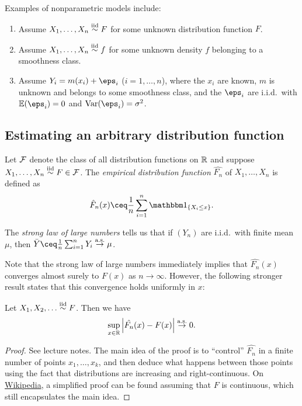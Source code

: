 \begin{example}
    Examples of nonparametric models include: 
    \begin{enumerate}
        \item Assume $X_1, \dotsc, X_n \overset{\mathrm{iid}}{\sim} F$ for some unknown distribution function $F$. 
        \item Assume $X_1, \dotsc, X_n \overset{\mathrm{iid}}{\sim} f$ for some unknown density $f$ belonging to a smoothness class.
        \item Assume $Y_i = m(x_i) + \eps_i$ ($i = 1, \dotsc, n$), where the $x_i$ are known, $m$ is unknown and belongs to some smoothness class, and the $\eps_i$ are i.i.d.\ with $\EE (\eps_i) = 0$ and $\Var(\eps_i) = \sigma^2$. 
    \end{enumerate}
\end{example}

\subsection{Estimating an arbitrary distribution function}
\begin{definition}
    Let $\mathcal F$ denote the class of all distribution functions on $\mathbb R$ and suppose $X_1, \dotsc, X_n \overset{\mathrm{iid}}{\sim} F \in \mathcal F$. The \emph{empirical distribution function} $\hat{F_n}$ of $X_1, \dotsc, X_n$ is defined as
    \[
    \hat F_n(x) \ceq \frac1n \sum_{i=1}^n \ind_\qty{X_i \leq x}.
    \]
\end{definition}

\begin{recap}
    The \emph{strong law of large numbers} tells us that if $(Y_n)$ are i.i.d.\ with finite mean $\mu$, then $\bar{Y} \ceq \frac1n \sum_{i=1}^n Y_i \toas \mu$. 
\end{recap}

Note that the strong law of large numbers immediately implies that $\hat{F_n}(x)$ converges almost surely to $F(x)$ as $n \to \infty$. However, the following stronger result states that this convergence holds uniformly in $x$: 

\begin{theorem} \label{thm:GC}
    Let $X_1, X_2, \dotsc \overset{\mathrm{iid}}{\sim} F$. Then we have 
    \[
    \sup_{x \in \mathbb R} \abs{\hat{F_n}(x) - F(x)}\overset{\mathrm{a.s.}}{\to} 0. 
    \]
\end{theorem}

\begin{proof}
    See lecture notes. The main idea of the proof is to ``control'' $\hat{F_n}$ in a finite number of points $x_1, \dotsc, x_k$, and then deduce what happens between those points using the fact that distributions are increasing and right-continuous. On \href{https://en.wikipedia.org/wiki/Glivenko%E2%80%93Cantelli_theorem#Proof}{Wikipedia}, 
        a simplified proof can be found assuming that $F$ is continuous, which still encapsulates the main idea.  
\end{proof}


